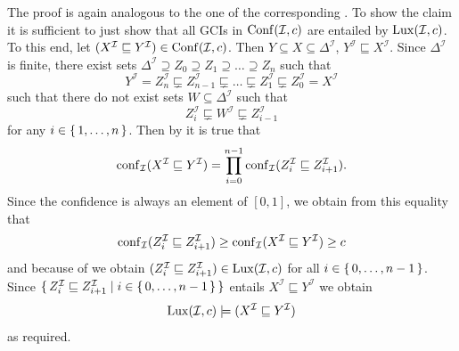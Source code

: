 \begin{Proof}
  The proof is again analogous to the one of the corresponding
  .  To show the claim it is sufficient to just show that all
  GCIs in $\operatorname{Conf}(\mathcal{I}, c)$ are entailed by $\operatorname{Lux}(\mathcal{I}, c)$.  To this end,
  let $(X^{\mathcal{I}} \sqsubseteq Y^{\mathcal{I}}) \in \operatorname{Conf}(\mathcal{I}, c)$.  Then $Y
  \subseteq X \subseteq \Delta^{\mathcal{I}}$, \ie $Y^{\mathcal{I}} \sqsubseteq
  X^{\mathcal{I}}$.  Since $\Delta^{\mathcal{I}}$ is finite, there exist sets
  $\Delta^{\mathcal{I}} \supseteq Z_0 \supseteq Z_1 \supseteq \dots \supseteq Z_n$ such
  that
  \begin{equation*}
    Y^{\mathcal{I}} = Z_n^{\mathcal{I}} \sqsubsetneq Z_{n-1}^{\mathcal{I}} \sqsubsetneq
    \dots \sqsubsetneq Z_1^{\mathcal{I}} \sqsubsetneq Z_0^{\mathcal{I}} = X^{\mathcal{I}}
  \end{equation*}
  such that there do not exist sets $W \subseteq \Delta^{\mathcal{I}}$ such that
  \begin{equation}
    \label{eq:25}
    Z_i^{\mathcal{I}} \sqsubsetneq W^{\mathcal{I}} \sqsubsetneq Z_{i-1}^{\mathcal{I}}
  \end{equation}
  for any $i \in {\ensuremath{\{\, 1, \dots, n \,\}}}$.  Then by
   it is true that
  \begin{equation*}
    \operatorname{conf}_{\mathcal{I}}(X^{\mathcal{I}} \sqsubseteq Y^{\mathcal{I}}) = \prod_{i = 0}^{n-1}
    \operatorname{conf}_{\mathcal{I}}(Z_i^{\mathcal{I}} \sqsubseteq Z_{i+1}^{\mathcal{I}}).
  \end{equation*}
  Since the confidence is always an element of $[0,1]$, we obtain from this equality that
  \begin{equation*}
    \operatorname{conf}_{\mathcal{I}}(Z_i^{\mathcal{I}} \sqsubseteq Z_{i+1}^{\mathcal{I}}) \ge
    \operatorname{conf}_{\mathcal{I}}(X^{\mathcal{I}} \sqsubseteq Y^{\mathcal{I}}) \ge c
  \end{equation*}
  and because of  we obtain $(Z_i^{\mathcal{I}} \sqsubseteq
  Z_{i+1}^{\mathcal{I}}) \in \operatorname{Lux}(\mathcal{I}, c)$ for all $i \in {\ensuremath{\{\, 0, \dots, n-1\,\}}}$.
  Since ${\{\, Z_i^{\mathcal{I}} \sqsubseteq Z_{i+1}^{\mathcal{I}} \mid i \in {\ensuremath{\{\, 0,
      \dots, n-1\,\}}} \,\}}$ entails $X^{\mathcal{I}} \sqsubseteq Y^{\mathcal{I}}$ we obtain
  \begin{equation*}
    \operatorname{Lux}(\mathcal{I}, c) \models (X^{\mathcal{I}} \sqsubseteq Y^{\mathcal{I}})
  \end{equation*}
  as required.
\end{Proof}

